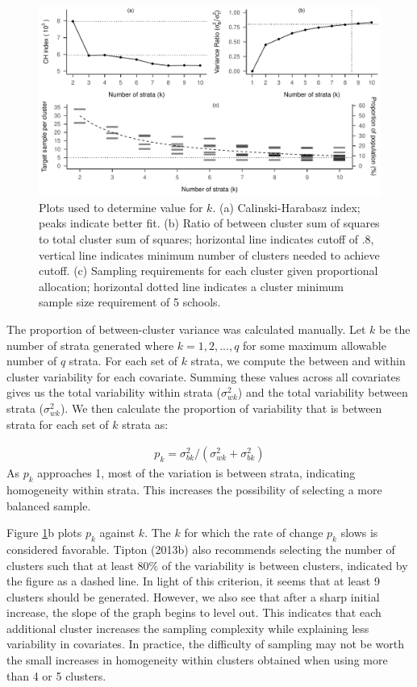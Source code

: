 \documentclass[english,man,floatsintext]{apa6}
\begin{document}
\begin{figure}[tbp]
\includegraphics[width=1\linewidth]{6---Paper_files/figure-latex/fig-k-plots-1} \caption{Plots used to determine value for \(k\). (a) Calinski-Harabasz index; peaks indicate better fit. (b) Ratio of between cluster sum of squares to total cluster sum of squares; horizontal line indicates cutoff of .8, vertical line indicates minimum number of clusters needed to achieve cutoff. (c) Sampling requirements for each cluster given proportional allocation; horizontal dotted line indicates a cluster minimum sample size requirement of 5 schools. }\label{fig:fig-k-plots}
\end{figure}

The proportion of between-cluster variance was calculated manually. Let \(k\) be the number of strata generated where \(k = 1, 2, ..., q\) for some maximum allowable number of \(q\) strata. For each set of \(k\) strata, we compute the between and within cluster variability for each covariate. Summing these values across all covariates gives us the total variability within strata (\(\sigma_{wk}^2\)) and the total variability between strata (\(\sigma_{wk}^2\)). We then calculate the proportion of variability that is between strata for each set of \(k\) strata as:

\begin{align} \label{eq:pk}
p_k = \sigma_{bk}^2/(\sigma_{wk}^2 + \sigma_{bk}^2)
\end{align}
As \(p_k\) approaches 1, most of the variation is between strata, indicating homogeneity within strata. This increases the possibility of selecting a more balanced sample.

Figure \ref{fig:fig-k-plots}b plots \(p_k\) against \(k\). The \(k\) for which the rate of change \(p_k\) slows is considered favorable. Tipton (2013b) also recommends selecting the number of clusters such that at least 80\% of the variability is between clusters, indicated by the figure as a dashed line. In light of this criterion, it seems that at least 9 clusters should be generated. However, we also see that after a sharp initial increase, the slope of the graph begins to level out. This indicates that each additional cluster increases the sampling complexity while explaining less variability in covariates. In practice, the difficulty of sampling may not be worth the small increases in homogeneity within clusters obtained when using more than 4 or 5 clusters.
\end{document}
